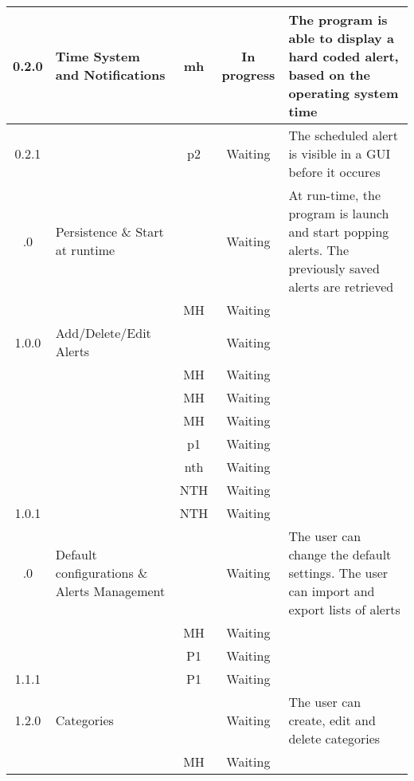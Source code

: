 \begin{longtable}{| c | p{5cm} | c | c | p{5cm} |}
	\rowcolor{aliceblue}0.2.0 & Time System and Notifications & \gls{mh} & In progress & The program is able to display a hard coded alert, based on the operating system time \\ \hline
	\rowcolor{aliceblue}0.2.1 & \fullref{subsec:usecase_launch} & \gls{p2} & Waiting & The scheduled alert is visible in a GUI before it occures \\ \boldhr
	0.3.0 & Persistence \& Start at runtime & & Waiting & At run-time, the program is launch and start popping alerts. The previously saved alerts are retrieved \\ \hline
	& \fullref{subsec:usecase_auto_start} & MH & Waiting & \\ \boldhr
	\rowcolor{aliceblue}1.0.0 & Add/Delete/Edit Alerts & & Waiting &  \\ \hline
	\rowcolor{aliceblue}& \fullref{subsec:usecase_add_simple_alert} & MH & Waiting &  \\ \hline
	\rowcolor{aliceblue}& \fullref{subsec:usecase_delete_simple_alert} & MH & Waiting &  \\ \hline
	\rowcolor{aliceblue}& \fullref{subsec:usecase_edit_simple_alert} & MH & Waiting &  \\ \hline
	\rowcolor{aliceblue}& \fullref{subsec:usecase_add_periodic_alert} & \gls{p1} & Waiting &  \\ \hline
	\rowcolor{aliceblue}& \fullref{subsec:usecase_add_email_sender} & \gls{nth} & Waiting &  \\ \hline
	\rowcolor{aliceblue}& \fullref{subsec:usecase_delete_email_sender} & NTH & Waiting &  \\ \hline
	\rowcolor{aliceblue}1.0.1 & \fullref{subsec:usecase_edit_email_sender} & NTH & Waiting &  \\ \boldhr
	1.1.0 & Default configurations \& Alerts Management &  & Waiting & The user can change the default settings. The user can import and export lists of alerts\\ \hline
	& \fullref{subsec:usecase_edit_default_configuration} & MH & Waiting & \\ \hline
	& \fullref{subsec:usecase_import_alerts} & P1 & Waiting & \\ \hline
	1.1.1 & \fullref{subsec:usecase_export_alerts} & P1 & Waiting &\\ \boldhr
	\rowcolor{aliceblue}1.2.0 & Categories & & Waiting & The user can create, edit and delete categories \\ \hline
	\rowcolor{aliceblue}& \fullref{subsec:usecase_add_category} & MH & Waiting & \\ \hline

\end{longtable}
